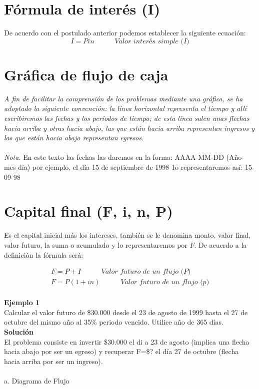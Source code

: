 \section{Fórmula de interés (I)}
De acuerdo con el postulado anterior podemos establecer la siguiente ecuación:
\begin{equation}
I = Pin \hspace{35pt} \textit{Valor interés simple (I)}
\end{equation}

\section{Gráfica de flujo de caja}
\textit{A fin de facilitar la comprensión de los problemas mediante una gráfica, se ha adoptado la siguiente convención: la línea horizontal representa el tiempo y allí escribiremos las fechas y los períodos de tiempo; de esta línea salen unas flechas hacia arriba y otras hacia abajo, las que están hacia arriba representan ingresos y las que están hacia abajo representan egresos}.
\\\\
\textit{Nota.} En este texto las fechas las daremos en la forma:  AAAA-MM-DD (Año-mes-día) por ejemplo, el día 15 de septiembre de 1998 1o representaremos así:         15-09-98

\section{Capital final (F, i, n, P)}
Es el capital inicial más los intereses, también se le denomina monto, valor final, valor futuro, la suma o acumulado y lo representaremos por $F$. De acuerdo a la definición la fórmula será:

\begin{align*}
    F=P+I \hspace{35pt} \textit{Valor futuro de un flujo (P)}\\
    F= P(1+in)\hspace{35pt} \textit{Valor futuro de un flujo (p)}\\
\end{align*}

\textbf{Ejemplo 1}\\
Calcular el valor futuro de \$30.000 desde el 23 de agosto de 1999 hasta el 27 de octubre del mismo año al 35\% periodo vencido. Utilice año de 365 días. \\

\textbf{Solución}\\
El problema consiste en invertir \$30.000 el di a 23 de agosto (implica una flecha hacia abajo por ser un egreso) y recuperar F=\$? el día 27 de octubre (flecha hacia arriba por ser un ingreso).
\\\\
a. Diagrama de Flujo

